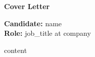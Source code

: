 \documentclass[11pt]{article}
\begin{document}
\begin{center}
{\Large \textbf{Cover Letter}}\\
\end{center}
\vspace{0.2in}
\textbf{Candidate:} {{name}}\\
\textbf{Role:} {{job_title}} at {{company}}
\vspace{0.2in}

{{content}}
\end{document}
